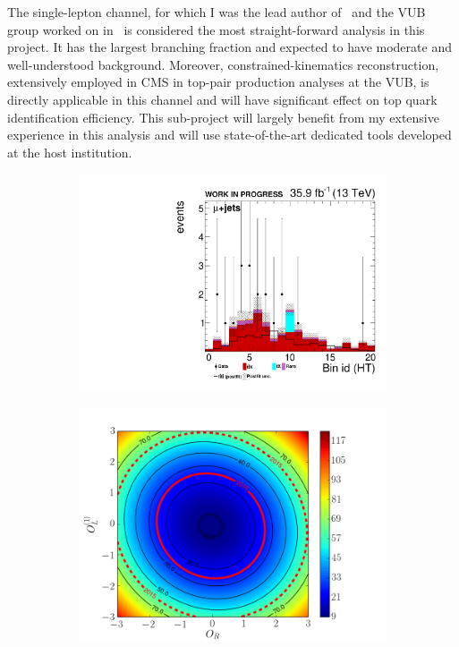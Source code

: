 \textcolor{\mycolor}{The single-lepton channel, for which I was the lead author of~\cite{Sirunyan:2017tep} and the VUB group worked on in~\cite{Khachatryan:2014sca} is considered the most straight-forward analysis in this project. It has the largest branching fraction and expected to have moderate and well-understood background. Moreover, constrained-kinematics reconstruction, extensively employed in CMS in top-pair production analyses at the VUB, is directly applicable in this channel and will have significant effect on top quark identification efficiency. This sub-project will largely benefit from my extensive experience in this analysis and will use state-of-the-art dedicated tools developed at the host institution.
\begin{figure}
\centering
\begin{subfigure}[t]{0.5\textwidth}
\includegraphics[width=0.8\linewidth]{figures/mu_ht_lin}\subcaption{}\label{fig:2a}
\end{subfigure}%
\begin{subfigure}[t]{0.5\textwidth}
\includegraphics[width=\linewidth]{figures/C1_C2}\subcaption{}\label{fig:2b}

\end{subfigure}
\end{figure}}
